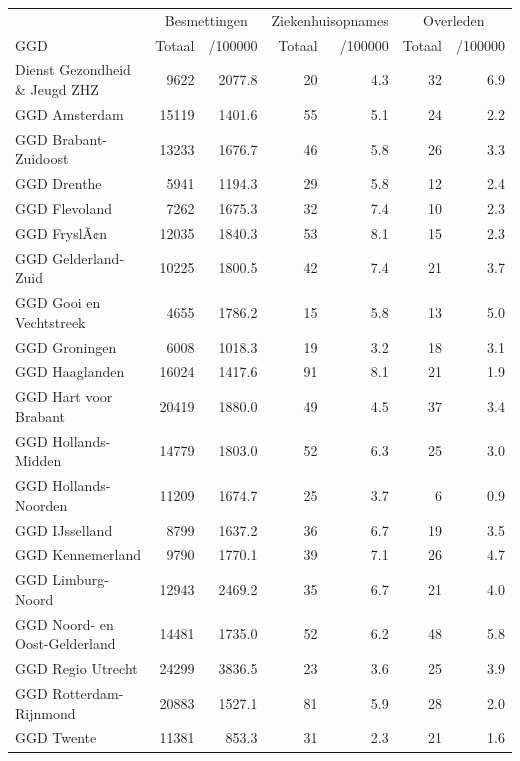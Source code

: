 \documentclass[
  english,
  man,floatsintext]{apa6}
\begin{document}
\begin{table}
\centering\begingroup\fontsize{10}{12}\selectfont

\begin{threeparttable}
\begin{tabular}{lrrrrrr}
\toprule
\multicolumn{1}{c}{ } & \multicolumn{2}{c}{Besmettingen} & \multicolumn{2}{c}{Ziekenhuisopnames} & \multicolumn{2}{c}{Overleden} \\
\cmidrule(l{3pt}r{3pt}){2-3} \cmidrule(l{3pt}r{3pt}){4-5} \cmidrule(l{3pt}r{3pt}){6-7}
GGD & Totaal & /100000 & Totaal & /100000 & Totaal & /100000\\
\midrule
Dienst Gezondheid \& Jeugd ZHZ & 9622 & 2077.8 & 20 & 4.3 & 32 & 6.9\\
GGD Amsterdam & 15119 & 1401.6 & 55 & 5.1 & 24 & 2.2\\
GGD Brabant-Zuidoost & 13233 & 1676.7 & 46 & 5.8 & 26 & 3.3\\
GGD Drenthe & 5941 & 1194.3 & 29 & 5.8 & 12 & 2.4\\
GGD Flevoland & 7262 & 1675.3 & 32 & 7.4 & 10 & 2.3\\
GGD FryslÃ¢n & 12035 & 1840.3 & 53 & 8.1 & 15 & 2.3\\
GGD Gelderland-Zuid & 10225 & 1800.5 & 42 & 7.4 & 21 & 3.7\\
GGD Gooi en Vechtstreek & 4655 & 1786.2 & 15 & 5.8 & 13 & 5.0\\
GGD Groningen & 6008 & 1018.3 & 19 & 3.2 & 18 & 3.1\\
GGD Haaglanden & 16024 & 1417.6 & 91 & 8.1 & 21 & 1.9\\
GGD Hart voor Brabant & 20419 & 1880.0 & 49 & 4.5 & 37 & 3.4\\
GGD Hollands-Midden & 14779 & 1803.0 & 52 & 6.3 & 25 & 3.0\\
GGD Hollands-Noorden & 11209 & 1674.7 & 25 & 3.7 & 6 & 0.9\\
GGD IJsselland & 8799 & 1637.2 & 36 & 6.7 & 19 & 3.5\\
GGD Kennemerland & 9790 & 1770.1 & 39 & 7.1 & 26 & 4.7\\
GGD Limburg-Noord & 12943 & 2469.2 & 35 & 6.7 & 21 & 4.0\\
GGD Noord- en Oost-Gelderland & 14481 & 1735.0 & 52 & 6.2 & 48 & 5.8\\
GGD Regio Utrecht & 24299 & 3836.5 & 23 & 3.6 & 25 & 3.9\\
GGD Rotterdam-Rijnmond & 20883 & 1527.1 & 81 & 5.9 & 28 & 2.0\\
GGD Twente & 11381 & 853.3 & 31 & 2.3 & 21 & 1.6\\

\end{tabular}
\end{threeparttable}
\end{table}
\end{document}
